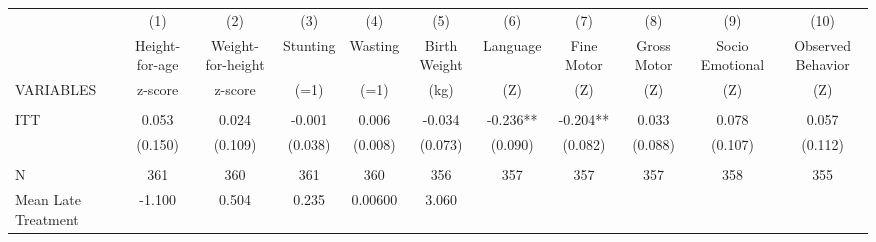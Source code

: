 \begin{tabular}{lcccccccccc} \hline
 & (1) & (2) & (3) & (4) & (5) & (6) & (7) & (8) & (9) & (10) \\
 & Height-for-age & Weight-for-height & Stunting & Wasting & Birth Weight & Language & Fine Motor & Gross Motor & Socio Emotional & Observed Behavior \\
VARIABLES & z-score & z-score & (=1) & (=1) & (kg) & (Z) & (Z) & (Z) & (Z) & (Z) \\ \hline
 &  &  &  &  &  &  &  &  &  &  \\
ITT & 0.053 & 0.024 & -0.001 & 0.006 & -0.034 & -0.236** & -0.204** & 0.033 & 0.078 & 0.057 \\
 & (0.150) & (0.109) & (0.038) & (0.008) & (0.073) & (0.090) & (0.082) & (0.088) & (0.107) & (0.112) \\
 &  &  &  &  &  &  &  &  &  &  \\
N & 361 & 360 & 361 & 360 & 356 & 357 & 357 & 357 & 358 & 355 \\
 Mean Late Treatment & -1.100 & 0.504 & 0.235 & 0.00600 & 3.060 &  &  &  &  &  \\ \hline
\end{tabular}

